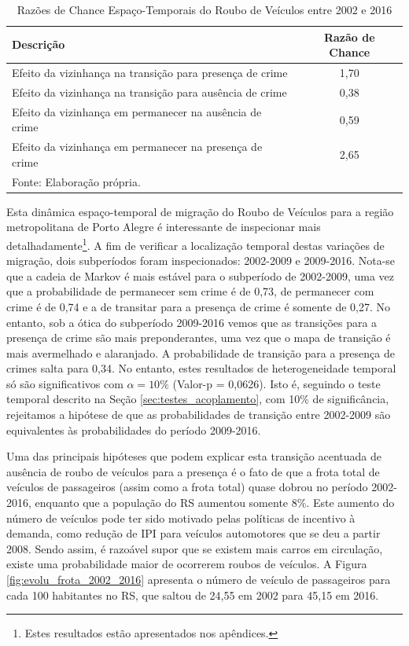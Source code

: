\documentclass[12pt,openright,oneside,a4paper,english,french,spanish]{abntex2}
\numberwithin{table}{section} %
\numberwithin{figure}{section} %
\begin{document}
\begin{table}[H]
\centering
\caption{Razões de Chance Espaço-Temporais do Roubo de Veículos entre 2002 e 2016}
        \begin{tabular}{lc}
            \hline
            {\textbf{Descrição}} & {\textbf{Razão de Chance}} \\\hline
            {Efeito da vizinhança na transição para presença de crime} & {1,70} \\
            {Efeito da vizinhança na transição para ausência de crime} & {0,38} \\
            {Efeito da vizinhança em permanecer na ausência de crime} & {0,59} \\
            {Efeito da vizinhança em permanecer na presença de crime} & {2,65} \\\hline
            \tiny Fonte: Elaboração própria.
        \end{tabular}
    \label{tab:odds_espaco_tempo_roub_vei_2002_2016}
\end{table}


Esta dinâmica espaço-temporal de migração do Roubo de Veículos para a região metropolitana de Porto Alegre é interessante de inspecionar mais detalhadamente\footnote{Estes resultados estão apresentados nos apêndices.}. A fim de verificar a localização temporal destas variações de migração, dois subperíodos foram inspecionados: 2002-2009 e 2009-2016. Nota-se que a cadeia de Markov é mais estável para o subperíodo de 2002-2009, uma vez que a probabilidade de permanecer sem crime é de 0,73, de permanecer com crime é de 0,74 e a de transitar para a presença de crime é somente de 0,27. No entanto, sob a ótica do subperíodo 2009-2016 vemos que as transições para a presença de crime são mais preponderantes, uma vez que o mapa de transição é mais avermelhado e alaranjado. A probabilidade de transição para a presença de crimes salta para 0,34. No entanto, estes resultados de heterogeneidade temporal só são significativos com $\alpha = 10\%$ (Valor-p = 0,0626). Isto é, seguindo o teste temporal descrito na Seção \ref{sec:testes_acoplamento}, com 10\% de significância, rejeitamos a hipótese de que as probabilidades de transição entre 2002-2009 são equivalentes às probabilidades do período 2009-2016.

Uma das principais hipóteses que podem explicar esta transição acentuada de ausência de roubo de veículos para a presença é o fato de que a frota total de veículos de passageiros (assim como a frota total) quase dobrou no período 2002-2016, enquanto que a população do RS aumentou somente 8\%. Este aumento do número de veículos pode ter sido motivado pelas políticas de incentivo à demanda, como redução de IPI para veículos automotores que se deu a partir 2008. Sendo assim, é razoável supor que se existem mais carros em circulação, existe uma probabilidade maior de ocorrerem roubos de veículos. A Figura \ref{fig:evolu_frota_2002_2016} apresenta o número de veículo de passageiros para cada 100 habitantes no RS, que saltou de 24,55 em 2002 para 45,15 em 2016. 
\end{document}
